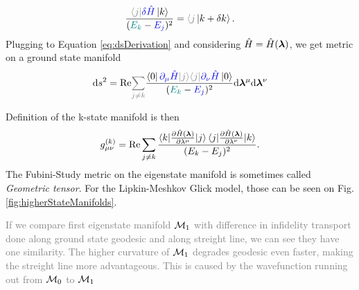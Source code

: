 \begin{equation}
    \frac{\textcolor{gray}{\bra{j}}\textcolor{blue}{\delta \HH}\ket{k}}{(\textcolor{teal}{E_k}-\textcolor{blue}{E_j})^2}=\textcolor{gray}{\langle j}\ket{k+\delta k}.
    \label{eq:braket_k,deltaj}
\end{equation}
Plugging to Equation \ref{eq:dsDerivation} and considering $\hat{H}=\hat{H}({\bm\lambda})$, we get metric on a ground state manifold
\begin{equation}
    \d s^2 = \Re\textcolor{gray}{\sum_{j\neq k}} \frac{\bra{0}\textcolor{blue}{\partial_\mu \HH \textcolor{gray}{\ket{j}}}\textcolor{gray}{\bra{j}}\textcolor{blue}{\partial_\nu \HH}\ket{0}}{(\textcolor{teal}{E_k}-\textcolor{blue}{E_j})^2}  \d \llambda^\mu\d \llambda^\nu
    \label{eq:distanceonM}
\end{equation}


Definition of the k-state manifold is then
\begin{equation}
    g_{\mu\nu}^{(k)} = \text{Re} \sum_{j\neq k}\frac{\braket{k|\frac{\partial \hat{H}({\bm\lambda})}{\partial \lambda^\mu}|j}\braket{j|\frac{\partial \hat{H}({\bm\lambda})}{\partial \lambda^\nu}|k}}{(E_k-E_j)^2}.
    \label{eq:metrictensork}
\end{equation}
The Fubini-Study metric on the eigenstate manifold is sometimes called \emph{Geometric tensor}. For the Lipkin-Meshkov Glick model, those can be seen on Fig. \ref{fig:higherStateManifolds}.


\textcolor{gray}{If we compare first eigenstate manifold $\mathcal{M}_1$ with difference in infidelity transport done along ground state geodesic and along streight line, we can see they have one similarity. The higher curvature of $\mathcal{M}_1$ degrades geodesic even faster, making the streight line more advantageous. This is caused by the wavefunction running out from $\mathcal{M}_0$ to $\mathcal{M}_1$}


